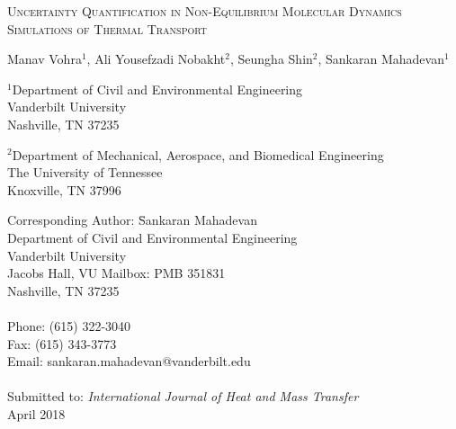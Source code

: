 \begin{center}
\textsc{
Uncertainty Quantification in Non-Equilibrium Molecular Dynamics Simulations of
Thermal Transport
}

\bigskip 
\bigskip 

Manav Vohra$^{1}$, Ali Yousefzadi Nobakht$^{2}$, Seungha Shin$^{2}$, Sankaran Mahadevan$^{1}$

\bigskip
\bigskip

\normalsize
$^1$Department of Civil and Environmental Engineering\\
Vanderbilt University\\
Nashville, TN 37235\\

\bigskip

$^2$Department of Mechanical, Aerospace, and Biomedical Engineering\\
The University of Tennessee\\
Knoxville, TN 37996\\

\bigskip

\end{center}

\vspace{6cm}

\begin{tabbing}
Corresponding Author: \hspace{5mm} \= Sankaran Mahadevan\\
       \>  Department of Civil and Environmental Engineering\\
       \>  Vanderbilt University\\
        Jacobs Hall, VU Mailbox: PMB 351831 \\
       \>  Nashville, TN 37235 \\
       \> \\
Phone: \> (615) 322-3040 \\
Fax:   \> (615) 343-3773 \\
Email: \>  sankaran.mahadevan@vanderbilt.edu   \\
\\
Submitted to: \> \textit{International Journal of Heat and Mass Transfer} \\
\>  April 2018\\

\bigskip
\end{tabbing}

\clearpage

